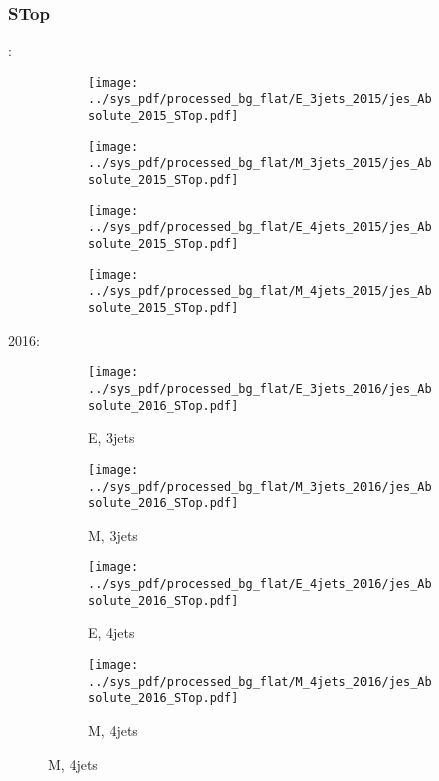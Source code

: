 \documentclass{beamer}
\begin{document}
\begin{frame}
\frametitle{STop}
\fontsize{5}{1}:
\begin{figure}
\centering
\begin{subfigure}[b]{0.24\textwidth}
\texttt{[image: ../sys\_pdf/processed\_bg\_flat/E\_3jets\_2015/jes\_Absolute\_2015\_STop.pdf]}
\end{subfigure}
\begin{subfigure}[b]{0.24\textwidth}
\texttt{[image: ../sys\_pdf/processed\_bg\_flat/M\_3jets\_2015/jes\_Absolute\_2015\_STop.pdf]}
\end{subfigure}
\begin{subfigure}[b]{0.24\textwidth}
\texttt{[image: ../sys\_pdf/processed\_bg\_flat/E\_4jets\_2015/jes\_Absolute\_2015\_STop.pdf]}
\end{subfigure}
\begin{subfigure}[b]{0.24\textwidth}
\texttt{[image: ../sys\_pdf/processed\_bg\_flat/M\_4jets\_2015/jes\_Absolute\_2015\_STop.pdf]}
\end{subfigure}
\end{figure}
2016:
\begin{figure}
\centering
\begin{subfigure}[b]{0.24\textwidth}
\texttt{[image: ../sys\_pdf/processed\_bg\_flat/E\_3jets\_2016/jes\_Absolute\_2016\_STop.pdf]}
\captionsetup{font=tiny}
\caption{E, 3jets}
\end{subfigure}
\begin{subfigure}[b]{0.24\textwidth}
\texttt{[image: ../sys\_pdf/processed\_bg\_flat/M\_3jets\_2016/jes\_Absolute\_2016\_STop.pdf]}
\captionsetup{font=tiny}
\caption{M, 3jets}
\end{subfigure}
\begin{subfigure}[b]{0.24\textwidth}
\texttt{[image: ../sys\_pdf/processed\_bg\_flat/E\_4jets\_2016/jes\_Absolute\_2016\_STop.pdf]}
\captionsetup{font=tiny}
\caption{E, 4jets}
\end{subfigure}
\begin{subfigure}[b]{0.24\textwidth}
\texttt{[image: ../sys\_pdf/processed\_bg\_flat/M\_4jets\_2016/jes\_Absolute\_2016\_STop.pdf]}
\captionsetup{font=tiny}
\caption{M, 4jets}
\end{subfigure}
\end{figure}
\end{frame}
\end{document}
